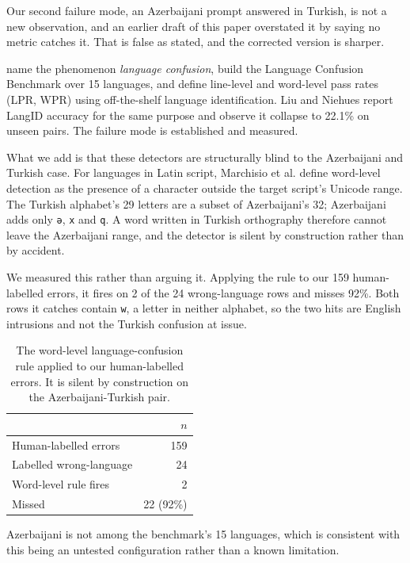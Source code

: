 \documentclass[final]{clv2025}
\begin{document}
Our second failure mode, an Azerbaijani prompt answered in Turkish, is not a
new observation, and an earlier draft of this paper overstated it by saying no
metric catches it. That is false as stated, and the corrected version is
sharper.

 name the phenomenon \emph{language confusion},
build the Language Confusion Benchmark over 15 languages, and define
line-level and word-level pass rates (LPR, WPR) using off-the-shelf language
identification. Liu and Niehues report LangID accuracy for the same purpose and
observe it collapse to 22.1\% on unseen pairs. The failure mode is established
and measured.

What we add is that these detectors are structurally blind to the Azerbaijani
and Turkish case. For languages in Latin script, Marchisio et al. define
word-level detection as the presence of a character outside the target script's
Unicode range. The Turkish alphabet's 29 letters are a subset of Azerbaijani's
32; Azerbaijani adds only \texttt{ə}, \texttt{x} and \texttt{q}. A word written
in Turkish orthography therefore cannot leave the Azerbaijani range, and the
detector is silent by construction rather than by accident.

We measured this rather than arguing it. Applying the rule to our 159
human-labelled errors, it fires on 2 of the 24 wrong-language rows and misses
92\%. Both rows it catches contain \texttt{w}, a letter in neither alphabet, so
the two hits are English intrusions and not the Turkish confusion at issue.

\begin{table}[h!]
\caption{The word-level language-confusion rule applied to our human-labelled
errors. It is silent by construction on the Azerbaijani-Turkish pair.}
\label{tab:confusion-related}
\centering
\begin{tabular}{lr}
\toprule
 & $n$ \\
\midrule
Human-labelled errors & 159 \\
Labelled wrong-language & 24 \\
Word-level rule fires & 2 \\
Missed & 22 (92\%) \\
\bottomrule
\end{tabular}
\end{table}

Azerbaijani is not among the benchmark's 15 languages, which is consistent with
this being an untested configuration rather than a known limitation.
\end{document}
